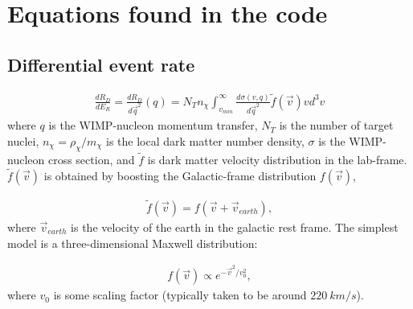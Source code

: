 \documentclass[12pt]{article}
\begin{document}
\clearpage

\section{Equations found in the code}
\subsection{Differential event rate}
\begin{equation}\label{ER}
\begin{split}
	\frac{dR_D}{dE_R} = \frac{dR_D}{d\vec{q}^2}(q)
	 = N_T n_\chi \int_{v_{min}}^\infty \frac{d\sigma(v,q)}{d\vec{q}^2} \tilde{f}(\vec{v})vd^3v
\end{split}
\end{equation}
where $q$ is the WIMP-nucleon momentum transfer, $N_T$ is the number of target 
nuclei, $n_\chi = \rho_\chi/m_\chi$ is the local dark matter number density, $\sigma$ 
is the WIMP-nucleon cross section, and $\tilde{f}$ is dark matter velocity 
distribution in the lab-frame. $\tilde{f}(\vec{v})$ is obtained by boosting 
the Galactic-frame distribution $f(\vec{v})$, 

\begin{equation}\label{boost}
\begin{split}
	\tilde{f}(\vec{v}) = f(\vec{v} + \vec{v}_{earth}),
\end{split}
\end{equation}
where $\vec{v}_{earth}$ is the velocity of the earth in the galactic rest 
frame. The simplest model is a three-dimensional Maxwell distribution:

\begin{equation}
\begin{split}
	f(\vec{v}) \propto e^{-\vec{v}^2/v_0^2},
\end{split}
\end{equation}
where $v_0$ is some scaling factor (typically taken to be around $220\ km/s$).
\end{document}
